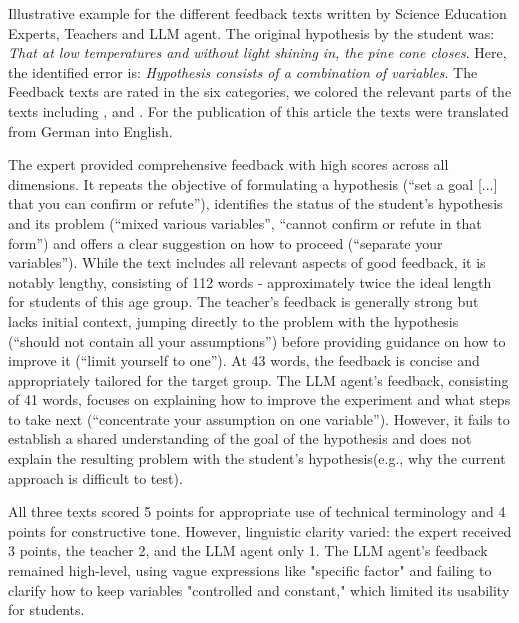 \begin{table}[htbp]
    \caption{Illustrative example for the different feedback texts written by Science Education Experts, Teachers and LLM agent. The original hypothesis by the student was: \textit{That at low temperatures and without light shining in, the pine cone closes}. Here, the identified error is: \textit{Hypothesis consists of a combination of variables}. The Feedback texts are rated in the six categories, we colored the relevant parts of the texts including ,  and . For the publication of this article the texts were translated from German into English.} %
    \label{tab:qualitative_example}
\end{table}

The expert provided comprehensive feedback with high scores across all dimensions. It repeats the objective of formulating a  hypothesis (``set a goal [...] that you can confirm or refute''), identifies the status of the student's hypothesis and its problem (``mixed various variables'', ``cannot confirm or refute in that form'') and offers a clear suggestion on how to proceed (``separate your variables''). While the text includes all relevant aspects of good feedback, it is notably lengthy, consisting of 112 words - approximately twice the ideal length for students of this age group.
%
The teacher's feedback is generally strong but lacks initial context, jumping directly to the problem with the hypothesis (``should not contain all your assumptions'') before providing guidance on how to improve it (``limit yourself to one''). At 43 words, the feedback is concise and appropriately tailored for the target group.
%
The LLM agent's feedback, consisting of 41 words, focuses on explaining how to improve the experiment and what steps to take next (``concentrate your assumption on one variable''). However, it fails to establish a shared understanding of the goal of the hypothesis and does not explain the resulting problem with the student's hypothesis(e.g., why the current approach is difficult to test).

All three texts scored 5 points for appropriate use of technical terminology and 4 points for constructive tone. However, linguistic clarity varied: the expert received 3 points, the teacher 2, and the LLM agent only 1. The LLM agent's feedback remained high-level, using vague expressions like "specific factor" and failing to clarify how to keep variables "controlled and constant," which limited its usability for students.


